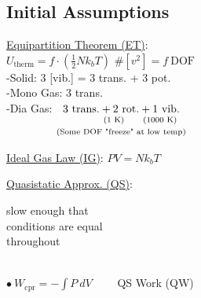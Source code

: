 \documentclass[12pt]{article}
\begin{document}
\subsection{Initial Assumptions}
\noindent
\begin{minipage}[t]{.49\textwidth}
    \underline{Equipartition Theorem (ET)}: \\[10pt]
    \(\boxed{ U_\text{therm} = f \cdot \left( \tfrac{1}{2} N k_b T \right) }\) 
        \hspace{15pt}\(\scriptstyle \#[v^2] = f\ \text{DOF}\) \\[10pt]
    -Solid: 3 [vib.] = 3 trans. + 3 pot. \\
    -Mono Gas: 3 trans.\\
    -Dia Gas: \(\begin{gathered}[t]
            \begin{aligned}[t]
                    &\text{3 trans.} + \text{2 rot.} + \text{1 vib.}\\[-6pt]
                    &\hspace{37pt} \text{\scriptsize(1 K)} \hspace{17pt} \text{\scriptsize(1000 K)} 
                \end{aligned}\\[-5pt]
            \text{\scriptsize(Some DOF "freeze" at low temp)}
        \end{gathered}\)
\end{minipage}
\begin{minipage}[t]{.49\textwidth}
    \underline{Ideal Gas Law (IG)}: \hspace{5pt} \(\boxed{ PV = N k_b T }\)

    \vspace{20pt}\noindent
    \underline{Quasistatic Approx. (QS)}: \hspace{5pt} \begin{minipage}{3cm}
            \scriptsize 
            slow enough that \\ conditions are equal \\ throughout
        \end{minipage}\\[10pt]
    \(\bullet\ \boxed{ W_\text{cpr} = - \int P\ dV }\) \ \ \ \ QS Work (QW)
\end{minipage}
\end{document}

